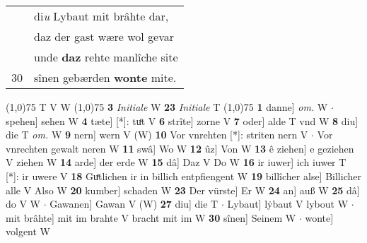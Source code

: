 \documentclass[8pt,a4paper,notitlepage]{article}
\begin{document}
\begin{table}[ht]
\begin{minipage}[t]{0.5\linewidth}
\begin{tabular}{rl}
 & di\textit{u} Lybaut mit brâhte dar,\\ 
 & daz der gast wære wol gevar\\ 
 & unde \textbf{daz} rehte manlîche site\\ 
30 & sînen gebærden \textbf{wonte} mite.\\ 
\end{tabular}
\scriptsize
\line(1,0){75} \newline
T V W \newline
\line(1,0){75} \newline
\textbf{3} \textit{Initiale} W  \textbf{23} \textit{Initiale} T  \newline
\line(1,0){75} \newline
\textbf{1} danne] \textit{om.} W  $\cdot$ spehen] sehen W \textbf{4} tæte] [*]: tuͦt V \textbf{6} strîte] zorne V \textbf{7} oder] alde T vnd W \textbf{8} diu] die T \textit{om.} W \textbf{9} nern] wern V (W) \textbf{10} Vor vnrehten [*]: striten nern V  $\cdot$ Vor vnrechten gewalt neren W \textbf{11} swâ] Wo W \textbf{12} ûz] Von W \textbf{13} ê ziehen] e geziehen V ziehen W \textbf{14} arde] der erde W \textbf{15} dâ] Daz V Do W \textbf{16} ir iuwer] ich iuwer T [*]: ir uwere V \textbf{18} Guͤtlichen ir in billich entpfiengent W \textbf{19} billîcher alse] Billicher alle V Also W \textbf{20} kumber] schaden W \textbf{23} Der vürste] Er W \textbf{24} an] auß W \textbf{25} dâ] do V W  $\cdot$ Gawanen] Gawan V (W) \textbf{27} diu] die T  $\cdot$ Lybaut] lẏbaut V lybout W  $\cdot$ mit brâhte] mit im brahte V bracht mit im W \textbf{30} sînen] Seinem W  $\cdot$ wonte] volgent W \newline
\end{minipage}
\end{table}
\end{document}
